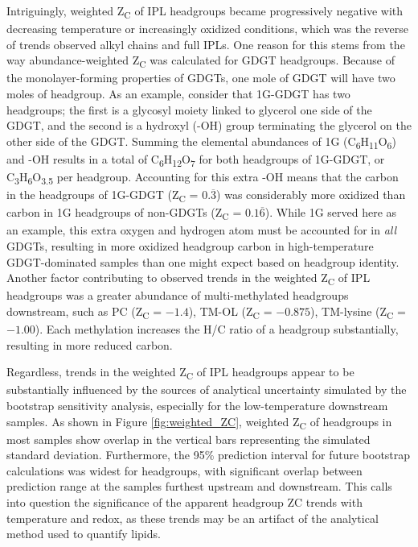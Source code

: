 Intriguingly, weighted Z\textsubscript{C} of IPL headgroups became progressively negative with decreasing temperature or increasingly oxidized conditions, which was the reverse of trends observed alkyl chains and full IPLs. One reason for this stems from the way abundance-weighted Z\textsubscript{C} was calculated for GDGT headgroups. Because of the monolayer-forming properties of GDGTs, one mole of GDGT will have two moles of headgroup. As an example, consider that 1G-GDGT has two headgroups; the first is a glycosyl moiety linked to glycerol one side of the GDGT, and the second is a hydroxyl (-OH) group terminating the glycerol on the other side of the GDGT. Summing the elemental abundances of 1G (C\textsubscript{6}H\textsubscript{11}O\textsubscript{6}) and -OH results in a total of C\textsubscript{6}H\textsubscript{12}O\textsubscript{7} for both headgroups of 1G-GDGT, or C\textsubscript{3}H\textsubscript{6}O\textsubscript{3.5} per headgroup. Accounting for this extra -OH means that the carbon in the headgroups of 1G-GDGT (Z\textsubscript{C} = $0.\overline{3}$) was considerably more oxidized than carbon in 1G headgroups of non-GDGTs (Z\textsubscript{C} = $0.1\overline{6}$). While 1G served here as an example, this extra oxygen and hydrogen atom must be accounted for in \textit{all} GDGTs, resulting in more oxidized headgroup carbon in high-temperature GDGT-dominated samples than one might expect based on headgroup identity. Another factor contributing to observed trends in the weighted Z\textsubscript{C} of IPL headgroups was a greater abundance of multi-methylated headgroups downstream, such as PC (Z\textsubscript{C} = $-1.4$), TM-OL (Z\textsubscript{C} = $-0.875$), TM-lysine (Z\textsubscript{C} = $-1.00$). Each methylation increases the H/C ratio of a headgroup substantially, resulting in more reduced carbon.

Regardless, trends in the weighted Z\textsubscript{C} of IPL headgroups appear to be substantially influenced by the sources of analytical uncertainty simulated by the bootstrap sensitivity analysis, especially for the low-temperature downstream samples. As shown in Figure \ref{fig:weighted_ZC}, weighted Z\textsubscript{C} of headgroups in most samples show overlap in the vertical bars representing the simulated standard deviation. Furthermore, the 95\% prediction interval for future bootstrap calculations was widest for headgroups, with significant overlap between prediction range at the samples furthest upstream and downstream. This calls into question the significance of the apparent headgroup ZC trends with temperature and redox, as these trends may be an artifact of the analytical method used to quantify lipids.



